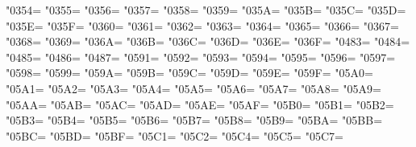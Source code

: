 \XeTeXcharclass"0354=\KclassCM
\XeTeXcharclass"0355=\KclassCM
\XeTeXcharclass"0356=\KclassCM
\XeTeXcharclass"0357=\KclassCM
\XeTeXcharclass"0358=\KclassCM
\XeTeXcharclass"0359=\KclassCM
\XeTeXcharclass"035A=\KclassCM
\XeTeXcharclass"035B=\KclassCM
\XeTeXcharclass"035C=\KclassCM
\XeTeXcharclass"035D=\KclassCM
\XeTeXcharclass"035E=\KclassCM
\XeTeXcharclass"035F=\KclassCM
\XeTeXcharclass"0360=\KclassCM
\XeTeXcharclass"0361=\KclassCM
\XeTeXcharclass"0362=\KclassCM
\XeTeXcharclass"0363=\KclassCM
\XeTeXcharclass"0364=\KclassCM
\XeTeXcharclass"0365=\KclassCM
\XeTeXcharclass"0366=\KclassCM
\XeTeXcharclass"0367=\KclassCM
\XeTeXcharclass"0368=\KclassCM
\XeTeXcharclass"0369=\KclassCM
\XeTeXcharclass"036A=\KclassCM
\XeTeXcharclass"036B=\KclassCM
\XeTeXcharclass"036C=\KclassCM
\XeTeXcharclass"036D=\KclassCM
\XeTeXcharclass"036E=\KclassCM
\XeTeXcharclass"036F=\KclassCM
\XeTeXcharclass"0483=\KclassCM
\XeTeXcharclass"0484=\KclassCM
\XeTeXcharclass"0485=\KclassCM
\XeTeXcharclass"0486=\KclassCM
\XeTeXcharclass"0487=\KclassCM
\XeTeXcharclass"0591=\KclassCM
\XeTeXcharclass"0592=\KclassCM
\XeTeXcharclass"0593=\KclassCM
\XeTeXcharclass"0594=\KclassCM
\XeTeXcharclass"0595=\KclassCM
\XeTeXcharclass"0596=\KclassCM
\XeTeXcharclass"0597=\KclassCM
\XeTeXcharclass"0598=\KclassCM
\XeTeXcharclass"0599=\KclassCM
\XeTeXcharclass"059A=\KclassCM
\XeTeXcharclass"059B=\KclassCM
\XeTeXcharclass"059C=\KclassCM
\XeTeXcharclass"059D=\KclassCM
\XeTeXcharclass"059E=\KclassCM
\XeTeXcharclass"059F=\KclassCM
\XeTeXcharclass"05A0=\KclassCM
\XeTeXcharclass"05A1=\KclassCM
\XeTeXcharclass"05A2=\KclassCM
\XeTeXcharclass"05A3=\KclassCM
\XeTeXcharclass"05A4=\KclassCM
\XeTeXcharclass"05A5=\KclassCM
\XeTeXcharclass"05A6=\KclassCM
\XeTeXcharclass"05A7=\KclassCM
\XeTeXcharclass"05A8=\KclassCM
\XeTeXcharclass"05A9=\KclassCM
\XeTeXcharclass"05AA=\KclassCM
\XeTeXcharclass"05AB=\KclassCM
\XeTeXcharclass"05AC=\KclassCM
\XeTeXcharclass"05AD=\KclassCM
\XeTeXcharclass"05AE=\KclassCM
\XeTeXcharclass"05AF=\KclassCM
\XeTeXcharclass"05B0=\KclassCM
\XeTeXcharclass"05B1=\KclassCM
\XeTeXcharclass"05B2=\KclassCM
\XeTeXcharclass"05B3=\KclassCM
\XeTeXcharclass"05B4=\KclassCM
\XeTeXcharclass"05B5=\KclassCM
\XeTeXcharclass"05B6=\KclassCM
\XeTeXcharclass"05B7=\KclassCM
\XeTeXcharclass"05B8=\KclassCM
\XeTeXcharclass"05B9=\KclassCM
\XeTeXcharclass"05BA=\KclassCM
\XeTeXcharclass"05BB=\KclassCM
\XeTeXcharclass"05BC=\KclassCM
\XeTeXcharclass"05BD=\KclassCM
\XeTeXcharclass"05BF=\KclassCM
\XeTeXcharclass"05C1=\KclassCM
\XeTeXcharclass"05C2=\KclassCM
\XeTeXcharclass"05C4=\KclassCM
\XeTeXcharclass"05C5=\KclassCM
\XeTeXcharclass"05C7=\KclassCM
